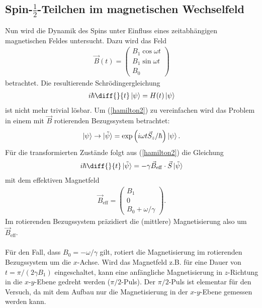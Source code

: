 \subsection{Spin-$\frac{1}{2}$-Teilchen im magnetischen Wechselfeld}
Nun wird die Dynamik des Spins unter Einfluss eines zeitabhängigen magnetischen Feldes untersucht. Dazu wird das Feld 
\begin{align*}
  \vec{B}(t)= \left( \begin{array}{c}
                    B_1\cos\omega t\\
                    B_1\sin \omega t \\
                    B_0
                  \end{array} \right)
\end{align*}
betrachtet. Die resultierende Schrödingergleichung
\begin{align}
i\hbar \diff{}{t} \ket{\psi}=H(t)\ket{\psi} \label{hamilton2}
\end{align}
ist nicht mehr trivial lösbar. Um (\ref{hamilton2}) zu vereinfachen wird das Problem in einem mit $\vec{B}$ rotierenden Bezugssystem betrachtet:
\begin{align*}
  \ket{\psi} \rightarrow \ket{\tilde{\psi}}=\exp \left(  i\omega t \vec{S}_z/\hbar\right) \ket{\psi}.
\end{align*}
Für die transformierten Zustände folgt aus (\ref{hamilton2}) die Gleichung
\begin{align*}
  i\hbar \diff{}{t}\ket{\tilde{\psi}}= -\gamma \vec{B}_\mathrm{eff} \cdot \vec{S} \ket{\tilde{\psi}}
\end{align*}
mit dem effektiven Magnetfeld 
\begin{align*}
  \vec{B}_\mathrm{eff}=\left( \begin{array}{c}
                    B_1\\
                    0\\
                    B_0+\omega/\gamma
                  \end{array} \right).
\end{align*}
Im rotierenden Bezugssystem präzidiert die (mittlere) Magnetisierung also um $\vec{B}_\mathrm{eff}$. \\ \\
Für den Fall, dass $B_0=-\omega/\gamma$ gilt, rotiert die Magnetisierung im rotierenden Bezugssystem um die $x$-Achse. Wird das Magnetfeld z.B. für eine Dauer von $t=\pi/(2\gamma B_1)$ eingeschaltet, kann eine anfängliche Magnetisierung in $z$-Richtung in die $x$-$y$-Ebene gedreht werden ($\pi/2$-Puls). Der $\pi/2$-Puls ist elementar für den Versuch, da mit dem Aufbau nur die Magnetisierung in der $x$-$y$-Ebene gemessen werden kann. \\ \\

